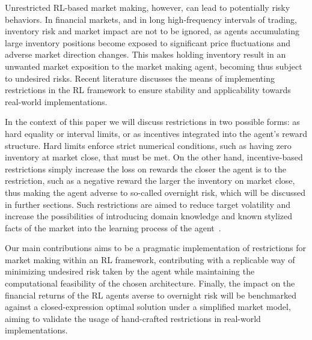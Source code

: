 Unrestricted RL-based market making, however, can lead to potentially risky behaviors.
In financial markets, and in long high-frequency intervals of trading, inventory risk and market impact are not to be ignored,
as agents accumulating large inventory positions become exposed to significant price fluctuations and adverse market direction changes.
This makes holding inventory result in an unwanted market exposition to the market making agent, becoming thus subject to undesired risks.
Recent literature discusses the means of implementing restrictions in the RL framework to ensure stability and applicability towards real-world implementations.

In the context of this paper we will discuss restrictions in two possible forms:
as hard equality or interval limits, or as incentives integrated into the agent's reward structure.
Hard limits enforce strict numerical conditions, such as having zero inventory at market close, that must be met.
On the other hand, incentive-based restrictions simply increase the loss on rewards the closer the agent is to the restriction,
such as a negative reward the larger the inventory on market close, thus making the agent adverse to so-called overnight risk,
which will be discussed in further sections.
Such restrictions are aimed to reduce target volatility and increase the possibilities of introducing domain knowledge
and known stylized facts of the market into the learning process of the agent~\cite{Jerome2022, Selser2021}.

Our main contributions aims to be a pragmatic implementation of restrictions for market making within an RL framework,
contributing with a replicable way of minimizing undesired risk taken by the agent while maintaining the computational feasibility of the chosen architecture.
Finally, the impact on the financial returns of the RL agents averse to overnight risk will be
benchmarked against a closed-expression optimal solution under a simplified market model,
aiming to validate the usage of hand-crafted restrictions in real-world implementations.